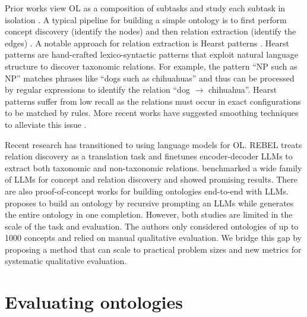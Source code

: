 Prior works view OL as a composition of subtasks and study each subtask in isolation \cite{buitelaar2005ontology,asim2018survey}. A typical pipeline for building a simple ontology is to first perform concept discovery (identify the nodes) and then relation extraction (identify the edges) \cite{cimiano2005text2onto,kaushik2018automatic}. A notable approach for relation extraction is Hearst patterns \cite{hearst1998automated}. Hearst patterns are hand-crafted lexico-syntactic patterns that exploit natural language structure to discover taxonomic relations. For example, the pattern ``NP such as NP'' matches phrases like ``dogs such as chihuahuas'' and thus can be processed by regular expressions to identify the relation ``dog $\to$ chihuahua''. Hearst patterns suffer from low recall as the relations must occur in exact configurations to be matched by rules. More recent works have suggested smoothing techniques to alleviate this issue \cite{roller2018hearst}.

Recent research has transitioned to using language models for OL. REBEL \cite{cabot2021rebel} treats relation discovery as a translation task and finetunes encoder-decoder LLMs to extract both taxonomic and non-taxonomic relations. \citet{babaei2023llms4ol} benchmarked a wide family of LLMs for concept and relation discovery and showed promising results. There are also proof-of-concept works for building ontologies end-to-end with LLMs. \citet{funk2023towards} proposes to build an ontology by recursive prompting an LLMs while \citet{trajanoska2023enhancing} generates the entire ontology in one completion. However, both studies are limited in the scale of the task and evaluation. The authors only considered ontologies of up to 1000 concepts and relied on manual qualitative evaluation. We bridge this gap by proposing a method that can scale to practical problem sizes and new metrics for systematic qualitative evaluation.

\section{Evaluating ontologies}

